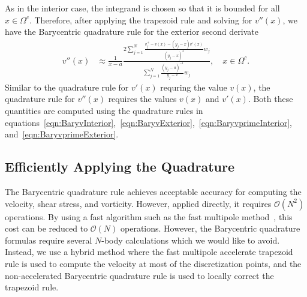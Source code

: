 \documentclass[preprint, 10pt]{elsarticle}
\begin{document}
As in the interior case, the integrand is chosen so that it is bounded
for all $x \in \Omega^c$.  Therefore, after applying the trapezoid rule
and solving for $v''(x)$, we have the Barycentric quadrature rule for
the exterior second derivate
\begin{align}
  v''(x) &\approx \frac{1}{x-a}\frac{2\sum\limits_{j=1}^N
    \frac{v^{+}_{j} - v(x) - (y_j-x)v'(x)}{(y_j-x)^3}w_j}
    {\sum\limits_{j=1}^N \frac{(y_j-a)^{-1}}{y_j-x}w_j}, 
    \quad x \in \Omega^c.
\end{align}
Similar to the quadrature rule for $v'(x)$ requring the value $v(x)$,
the quadrature rule for $v''(x)$ requires the values $v(x)$ and $v'(x)$.
Both these quantities are computed using the quadrature rules in
equations~\eqref{eqn:BaryvInterior},~\eqref{eqn:BaryvExterior},~\eqref{eqn:BaryvprimeInterior},
and~\eqref{eqn:BaryvprimeExterior}.



\subsection{Efficiently Applying the Quadrature}
\label{s:fmm}
The Barycentric quadrature rule achieves acceptable accuracy for
computing the velocity, shear stress, and vorticity.  However, applied
directly, it requires $\mathcal{O}(N^2)$ operations.  By using a fast
algorithm such as the fast multipole method~\cite{gre-rok1987}, this
cost can be reduced to $\mathcal{O}(N)$ operations.  However, the
Barycentric quadrature formulas require several $N$-body calculations
which we would like to avoid.  Instead, we use a hybrid method where the
fast multipole accelerate trapezoid rule is used to compute the velocity
at most of the discretization points, and the non-accelerated
Barycentric quadrature rule is used to locally correct the trapezoid
rule.
\end{document}
